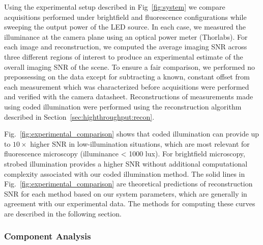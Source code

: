Using the experimental setup described in Fig~\ref{fig:system} we compare acquisitions performed under brightfield and fluorescence configurations while sweeping the output power of the LED source. In each case, we measured the illuminance at the camera plane using an optical power meter (Thorlabs). For each image and reconstruction, we computed the average imaging SNR across three different regions of interest to produce an experimental estimate of the overall imaging SNR of the scene. To ensure a fair comparison, we performed no prepossessing on the data except for subtracting a known, constant offset from each measurement which was characterized before acquisitions were performed and verified with the camera datasheet. Reconstructions of measurements made using coded illumination were performed using the reconstruction algorithm described in Section~\ref{sec:highthroughput:recon}.

Fig.~\ref{fig:experimental_comparison} shows that coded illumination can provide up to $10\times$ higher SNR in low-illumination situations, which are most relevant for fluorescence microscopy (illuminance < 1000 lux). For brightfield microscopy, strobed illumination provides a higher SNR without additional computational complexity associated with our coded illumination method. The solid lines in Fig.~\ref{fig:experimental_comparison} are theoretical predictions of reconstruction SNR for each method based on our system parameters, which are generally in agreement with our experimental data. The methods for computing these curves are described in the following section.

\subsubsection{Component Analysis}\label{sec:highthroughput:component_analysis}

